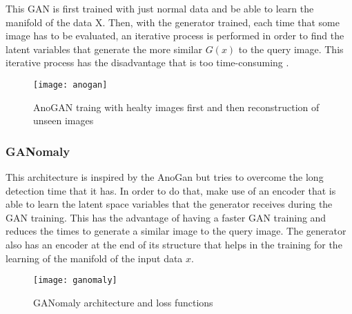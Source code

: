 This GAN is first trained with just normal data and be able to learn the manifold of the data X. Then, with the generator trained, each time that some image has to be evaluated, an iterative process is performed in order to find the latent variables that generate the more similar \begin{math}G(x)\end{math} to the query image. This iterative process has the disadvantage that is too time-consuming \cite{Schlegl2017}.

\begin{figure}[htb]
  \centering
  \texttt{[image: anogan]}
  \caption[AnoGAN]{AnoGAN traing with healty images first and then reconstruction of unseen images\cite{Schlegl2017}}
  \label{fig:anogan}
\end{figure}

\subsubsection{GANomaly}

This architecture is inspired by the AnoGan but tries to overcome the long detection time that it has. In order to do that, make use of an encoder that is able to learn the latent space variables that the generator receives during the GAN training. This has the advantage of having a faster GAN training and reduces the times to generate a similar image to the query image. The generator also has an encoder at the end of its structure that helps in the training for the learning of the manifold of the input data \begin{math}x\end{math}.

\begin{figure}[htb]
  \centering
  \texttt{[image: ganomaly]}
  \caption[GANomaly]{GANomaly architecture and loss functions \cite{DiMattia2019}}
  \label{fig:ganomaly}
\end{figure}
